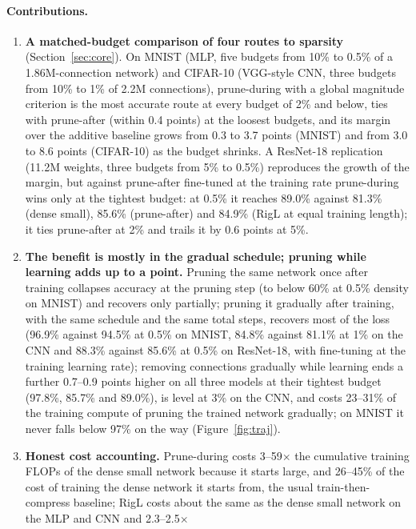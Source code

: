 \documentclass[11pt]{article}
\begin{document}
\paragraph{Contributions.}
\begin{enumerate}
  \item \textbf{A matched-budget comparison of four routes to sparsity} (Section~\ref{sec:core}). On MNIST (MLP, five
  budgets from 10\% to 0.5\% of a 1.86M-connection network) and CIFAR-10 (VGG-style CNN, three budgets from 10\% to 1\% of
  2.2M connections), prune-during with a global magnitude criterion is the most accurate route at every budget of 2\% and
  below, ties with prune-after (within 0.4 points) at the loosest budgets, and its margin over the additive baseline grows from
  0.3 to 3.7 points (MNIST) and from 3.0 to 8.6 points (CIFAR-10) as the budget shrinks. A ResNet-18 replication (11.2M weights, three budgets from 5\% to 0.5\%) reproduces the
  growth of the margin, but against prune-after fine-tuned at the training rate prune-during wins only at the tightest
  budget: at 0.5\% it reaches 89.0\% against 81.3\% (dense small), 85.6\% (prune-after) and 84.9\% (RigL at equal
  training length); it ties prune-after at 2\% and trails it by 0.6 points at 5\%.
  \item \textbf{The benefit is mostly in the gradual schedule; pruning while learning adds up to a point.} Pruning the same
  network once after training collapses accuracy at the pruning step (to below 60\% at 0.5\% density on MNIST) and recovers
  only partially; pruning it gradually after training, with the same schedule and the same total steps, recovers most of
  the loss (96.9\% against 94.5\% at 0.5\% on MNIST, 84.8\% against 81.1\% at 1\% on the CNN and 88.3\% against 85.6\%
  at 0.5\% on ResNet-18, with fine-tuning at the training learning rate); removing connections gradually while learning
  ends a further 0.7--0.9 points higher on all three models at their tightest budget (97.8\%, 85.7\% and 89.0\%), is level
  at 3\% on the CNN, and costs 23--31\% of the training compute of pruning the trained network gradually; on MNIST it never falls below 97\% on the way (Figure~\ref{fig:traj}).
  \item \textbf{Honest cost accounting.} Prune-during costs 3--59$\times$ the cumulative training FLOPs of the dense small
  network because it starts large, and 26--45\% of the cost of training the dense network it starts from, the usual
  train-then-compress baseline; RigL costs about the same as the dense small network on the MLP and CNN and 2.3--2.5$\times$

\end{enumerate}
\end{document}
